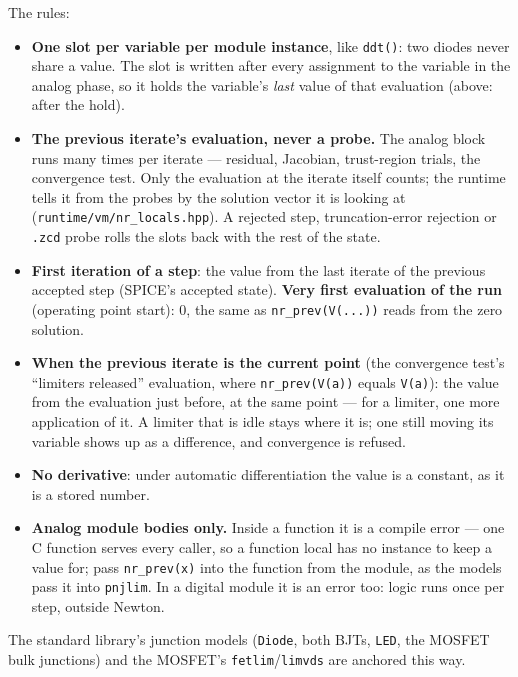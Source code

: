 \documentclass[11pt, a4paper]{article}
\newcommand{\code}[1]{\texttt{\small #1}}
\begin{document}
The rules:
\begin{itemize}
  \item \textbf{One slot per variable per module instance}, like \code{ddt()}:
        two diodes never share a value. The slot is written after every
        assignment to the variable in the analog phase, so it holds the
        variable's \emph{last} value of that evaluation (above: after the hold).
  \item \textbf{The previous iterate's evaluation, never a probe.} The analog
        block runs many times per iterate --- residual, Jacobian, trust-region
        trials, the convergence test. Only the evaluation at the iterate itself
        counts; the runtime tells it from the probes by the solution vector it
        is looking at (\code{runtime/vm/nr\_locals.hpp}). A rejected step,
        truncation-error rejection or \code{.zcd} probe rolls the slots back
        with the rest of the state.
  \item \textbf{First iteration of a step}: the value from the last iterate of
        the previous accepted step (SPICE's accepted state). \textbf{Very first
        evaluation of the run} (operating point start): 0, the same as
        \code{nr\_prev(V(...))} reads from the zero solution.
  \item \textbf{When the previous iterate is the current point} (the convergence
        test's ``limiters released'' evaluation, where \code{nr\_prev(V(a))}
        equals \code{V(a)}): the value from the evaluation just before, at the
        same point --- for a limiter, one more application of it. A limiter that
        is idle stays where it is; one still moving its variable shows up as a
        difference, and convergence is refused.
  \item \textbf{No derivative}: under automatic differentiation the value is a
        constant, as it is a stored number.
  \item \textbf{Analog module bodies only.} Inside a function it is a compile
        error --- one C function serves every caller, so a function local has
        no instance to keep a value for; pass \code{nr\_prev(x)} into the
        function from the module, as the models pass it into \code{pnjlim}.
        In a digital module it is an error too: logic runs once per step,
        outside Newton.
\end{itemize}

The standard library's junction models (\code{Diode}, both BJTs, \code{LED},
the MOSFET bulk junctions) and the MOSFET's \code{fetlim}/\code{limvds} are
anchored this way.
\end{document}
